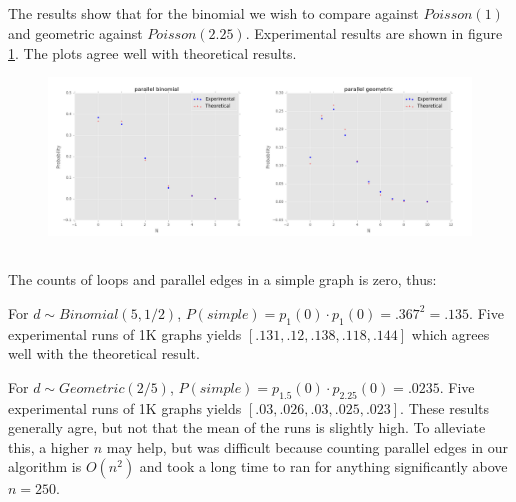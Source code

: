 \documentclass{article}
\begin{document}
\subsection{}
\vspace{-2ex}
The results show that for the binomial we wish to compare against $Poisson(1)$ and geometric against $Poisson(2.25)$. Experimental results are shown in figure \ref{parallel}. The plots agree well with theoretical results.

\begin{figure}[!ht]
	\centering
	\includegraphics[width=\textwidth]{parallel.png}
	\label{parallel}
\end{figure}

\subsection{}
\vspace{-2ex}
The counts of loops and parallel edges in a simple graph is zero, thus:

For $d\sim Binomial(5,1/2)$, $P(simple)=p_1(0)\cdot p_1(0)=.367^2=.135$. Five experimental runs of 1K graphs yields $[.131,.12,.138,.118,.144]$ which agrees well with the theoretical result.

For $d\sim Geometric(2/5)$, $P(simple)=p_{1.5}(0)\cdot p_{2.25}(0)=.0235$. Five experimental runs of 1K graphs yields $[.03,.026,.03, .025, .023]$. These results generally agre, but not that the mean of the runs is slightly high. To alleviate this, a higher $n$ may help, but was difficult because counting parallel edges in our algorithm is $O(n^2)$ and took a long time to ran for anything significantly above $n=250$.
\end{document}

